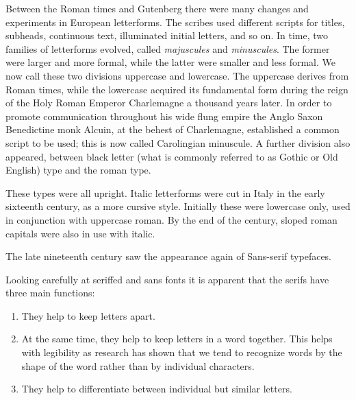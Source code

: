 \documentclass[10pt,letterpaper,extrafontsizes]{memoir}
\begin{document}
    Between the Roman times and Gutenberg there were many changes and
experiments in European letterforms. The scribes used different scripts
for titles, subheads, continuous text, illuminated initial letters, and so
on. In time, two families of letterforms evolved, 
called \emph{majuscules} and \emph{minuscules}. 
The former were larger and more formal, while the latter
were smaller and less formal. We now call these two divisions uppercase and
lowercase. The uppercase derives from Roman times, while the lowercase
acquired its fundamental form during the reign of the Holy Roman Emperor
Charlemagne a thousand years later. In order to 
promote communication
throughout his wide flung empire the Anglo Saxon Benedictine monk 
Alcuin, at the behest of Charlemagne, established a common
script to be used; this is now called Carolingian 
minuscule.
A further division also appeared, between black letter (what is
commonly referred to as Gothic or Old English) type and the roman type.

    These types were all upright. Italic letterforms were 
cut in Italy
in the early sixteenth century, as a more cursive style. Initially these were
lowercase only, used in conjunction with uppercase roman. By the end of
the century, sloped roman capitals were also in use with italic.

    The late nineteenth century saw the appearance again of 
Sans-serif
typefaces.

    Looking carefully at seriffed and sans fonts it is apparent that
the serifs have three main functions:
\begin{enumerate}
\item They help to keep letters apart.
\item At the same time, they help to keep letters in a word together. This
  helps with legibility as research has shown that 
  we tend to recognize
  words by the shape of the word rather than by individual characters.
\item They help to differentiate between individual but similar letters.
\end{enumerate}
\end{document}
